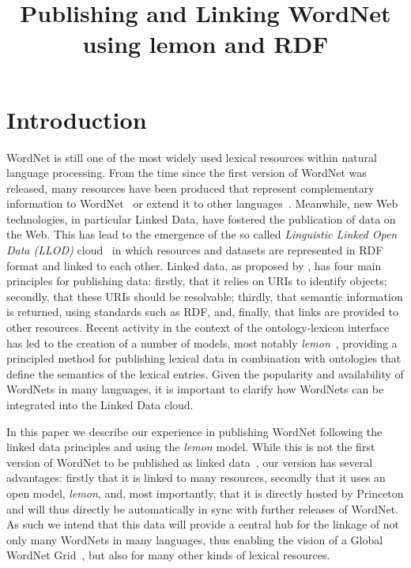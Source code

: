\documentclass[10pt, a4paper]{article}
\title{Publishing and Linking WordNet using lemon and RDF}
\newcommand{\lemon}[0]{\emph{lemon}}
\begin{document}
\maketitleabstract

\section{Introduction}

WordNet is still one of the most widely used lexical resources within natural 
language processing. From the time since the first version of WordNet was released, many
resources have been produced that represent complementary information to WordNet~\cite{schuler2005verbnet,baker1998berkeley}
or extend it to other languages~\cite{vossen1998eurowordnet,bond2013linking}. 
Meanwhile, new Web technologies, in particular Linked Data, have fostered the publication of data on the Web.
This has lead to the emergence of the so called \emph{Linguistic Linked Open Data (LLOD)} cloud~\cite{chiarcos2011towards} in which resources and datasets are represented in RDF format and linked to each other.
Linked data, as proposed by \cite{berners2011linked}, has four
main principles for publishing data: firstly, that it relies on URIs to identify
objects; secondly, that these URIs should be resolvable; thirdly, that semantic
information is returned, using standards such as RDF, and, finally, that links are
provided to other resources. 
Recent activity in the context of the ontology-lexicon interface has
led to the creation of a number of models, most notably
\lemon{}~\cite{mccrae2012interchanging}, providing a principled method for publishing lexical data in combination with ontologies that define the semantics of the lexical entries.
Given the popularity and availability of WordNets in
many languages, it is important to clarify how WordNets can be integrated into the Linked Data cloud.

In this paper we describe our experience
in publishing WordNet following the linked data principles and using the \lemon{} model. While this is not
the first version of WordNet to be published as linked data~\cite{van2006conversion,mccrae2012integrating,graves2006data}, our 
version has several advantages: firstly that it is linked to many
resources, secondly that it uses an open model, \emph{lemon}, and, most importantly, that 
it is directly hosted by Princeton and will thus directly be automatically in sync with further releases of WordNet. 
As such we intend that this data will provide a central hub for the linkage of
not only many WordNets in many languages, thus enabling the vision of a Global
WordNet Grid~\cite{pease2008building}, but also for many other kinds of lexical resources. 
\end{document}
